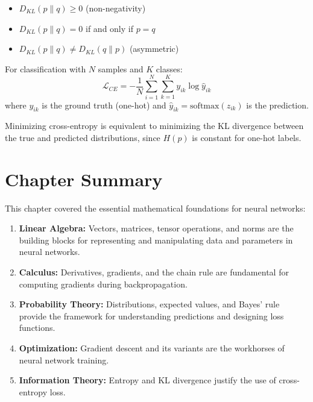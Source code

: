 \begin{property}
\begin{itemize}
    \item $D_{KL}(p \| q) \geq 0$ (non-negativity)
    \item $D_{KL}(p \| q) = 0$ if and only if $p = q$
    \item $D_{KL}(p \| q) \neq D_{KL}(q \| p)$ (asymmetric)
\end{itemize}
\end{property}

\begin{example}
For classification with $N$ samples and $K$ classes:
\begin{equation}
\mathcal{L}_{CE} = -\frac{1}{N}\sum_{i=1}^{N}\sum_{k=1}^{K} y_{ik} \log \hat{y}_{ik}
\end{equation}
where $y_{ik}$ is the ground truth (one-hot) and $\hat{y}_{ik} = \text{softmax}(z_{ik})$ is the prediction.

Minimizing cross-entropy is equivalent to minimizing the KL divergence between the true and predicted distributions, since $H(p)$ is constant for one-hot labels.
\end{example}

\section{Chapter Summary}

This chapter covered the essential mathematical foundations for neural networks:

\begin{enumerate}
    \item \textbf{Linear Algebra:} Vectors, matrices, tensor operations, and norms are the building blocks for representing and manipulating data and parameters in neural networks.
    
    \item \textbf{Calculus:} Derivatives, gradients, and the chain rule are fundamental for computing gradients during backpropagation.
    
    \item \textbf{Probability Theory:} Distributions, expected values, and Bayes' rule provide the framework for understanding predictions and designing loss functions.
    
    \item \textbf{Optimization:} Gradient descent and its variants are the workhorses of neural network training.
    
    \item \textbf{Information Theory:} Entropy and KL divergence justify the use of cross-entropy loss.
\end{enumerate}


